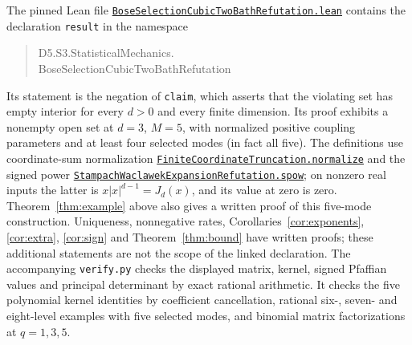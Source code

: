 \documentclass[11pt]{article}
\begin{document}
The pinned Lean file
\href{https://github.com/the-omega-institute/trureturing/blob/6ffa76e4424ce4c0d1048e56afb0724762ed8285/D5/S3/StatisticalMechanics/BoseSelectionCubicTwoBathRefutation.lean}{\texttt{BoseSelectionCubicTwoBathRefutation.lean}}
contains the declaration \texttt{result} in the namespace
\begin{quote}\small\ttfamily
D5.S3.StatisticalMechanics.\\
BoseSelectionCubicTwoBathRefutation
\end{quote}
Its statement is the negation of \texttt{claim}, which asserts
that the violating set has empty interior for every $d>0$ and
every finite dimension. Its proof exhibits a nonempty open
set at $d=3$, $M=5$, with normalized positive coupling
parameters and at least four selected modes (in fact all five).
The definitions use coordinate-sum normalization
\href{https://github.com/the-omega-institute/trureturing/blob/6ffa76e4424ce4c0d1048e56afb0724762ed8285/D5/S3/Geometry/FiniteCoordinateTruncation.lean}{\texttt{FiniteCoordinateTruncation.normalize}}
and the signed power
\href{https://github.com/the-omega-institute/trureturing/blob/6ffa76e4424ce4c0d1048e56afb0724762ed8285/D5/S3/Analytic/SeriesInequalities/StampachWaclawekExpansionRefutation.lean}{\texttt{StampachWaclawekExpansionRefutation.spow}};
on nonzero real inputs the latter is $x|x|^{d-1}=J_d(x)$,
and its value at zero is zero.
Theorem~\ref{thm:example} above also gives a written proof of this
five-mode construction. Uniqueness, nonnegative rates,
Corollaries~\ref{cor:exponents}, \ref{cor:extra}, \ref{cor:sign}
and Theorem~\ref{thm:bound} have written proofs; these additional
statements are not the scope of the linked declaration.
The accompanying \texttt{verify.py} checks the displayed matrix,
kernel, signed Pfaffian values and principal determinant by
exact rational arithmetic. It checks the five polynomial
kernel identities by coefficient cancellation, rational
six-, seven- and eight-level examples with five selected modes,
and binomial matrix factorizations at $q=1,3,5$.
\end{document}
